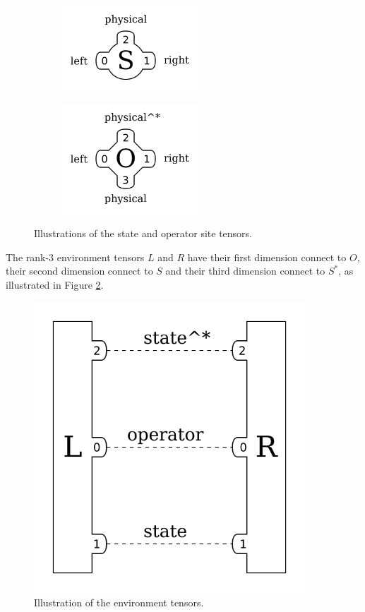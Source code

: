 \documentclass{article}
\newcommand{\diagramwidth}{4in}
\begin{document}
\begin{figure}
\centering
\begin{subfigure}{2in}
\includegraphics[width=2in]{drawings/state_site_tensor-car}
\end{subfigure}
\begin{subfigure}{2in}
\includegraphics[width=2in]{drawings/operator_site_tensor-car}
\end{subfigure}
\caption{\label{fig:site-tensors-car} Illustrations of the state and operator site tensors.}
\end{figure}

The rank-3 environment tensors $L$ and $R$ have their first dimension connect to $O$, their second dimension connect to $S$ and their third dimension connect to $S^* $, as illustrated in Figure \ref{fig:environment-tensors-car}.

\begin{figure}\begin{center}
\includegraphics[width=\diagramwidth]{drawings/expectation_boundary_tensors-car}
\caption{\label{fig:environment-tensors-car} Illustration of the environment tensors.}
\end{center}\end{figure}
\end{document}
